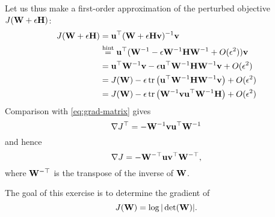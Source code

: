 \begin{exenumerate}
\begin{solution}
    Let us thus make a first-order approximation of the perturbed objective $J(\mathbf{W} + \epsilon \mathbf{H})$: 
    \begin{align}
      J(\mathbf{W} + \epsilon\mathbf{H}) &= \mathbf{u}^\top(\mathbf{W} + \epsilon\mathbf{H}\mathbf{v})^{-1}\mathbf{v} \\
                         &\overset{\textrm{hint}}{=} \mathbf{u}^\top(\mathbf{W}^{-1} - \epsilon \mathbf{W}^{-1}\mathbf{H} \mathbf{W}^{-1} + O(\epsilon^2))\mathbf{v} \\
                         &= \mathbf{u}^\top \mathbf{W}^{-1}\mathbf{v} - \epsilon \mathbf{u}^\top\mathbf{W}^{-1}\mathbf{H}\mathbf{W}^{-1}\mathbf{v} + O(\epsilon^2) \\
                         &= J(\mathbf{W}) -  \epsilon \operatorname{tr}\left(\mathbf{u}^\top\mathbf{W}^{- 1}\mathbf{H}\mathbf{W}^{-1}\mathbf{v}\right) + O(\epsilon^2) \\
                         &= J(\mathbf{W}) - \epsilon \operatorname{tr}\left(\mathbf{W}^{-1}\mathbf{v}\mathbf{u}^\top\mathbf{W}^{-1}\mathbf{H}\right) + O(\epsilon^2)
    \end{align}
    Comparison with \eqref{eq:grad-matrix} gives
    \begin{equation}
      \nabla J^\top = -\mathbf{W}^{-1}\mathbf{v}\mathbf{u}^\top\mathbf{W}^{-1}
    \end{equation}
    and hence
    \begin{equation}
      \nabla J = -\mathbf{W}^{-\top}\mathbf{u}\mathbf{v}^\top\mathbf{W}^{-\top},
    \end{equation}
where $\mathbf{W}^{-\top}$ is the transpose of the inverse of $\mathbf{W}$.

\end{solution}
\end{exenumerate}


\label{ex:grad-log-det}
The goal of this exercise is to determine the gradient of
\begin{equation}
  J(\mathbf{W}) = \log | \det(\mathbf{W})|.
\end{equation}

